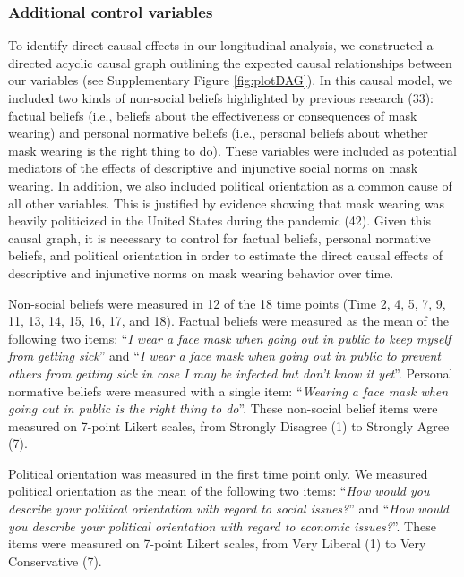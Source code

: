 \documentclass[
  man, donotrepeattitle,floatsintext]{apa6}
\begin{document}
\hypertarget{additional-control-variables}{%
\subsubsection{Additional control variables}\label{additional-control-variables}}

To identify direct causal effects in our longitudinal analysis, we constructed a directed acyclic causal graph outlining the expected causal relationships between our variables (see Supplementary Figure \ref{fig:plotDAG}). In this causal model, we included two kinds of non-social beliefs highlighted by previous research (33): factual beliefs (i.e., beliefs about the effectiveness or consequences of mask wearing) and personal normative beliefs (i.e., personal beliefs about whether mask wearing is the right thing to do). These variables were included as potential mediators of the effects of descriptive and injunctive social norms on mask wearing. In addition, we also included political orientation as a common cause of all other variables. This is justified by evidence showing that mask wearing was heavily politicized in the United States during the pandemic (42). Given this causal graph, it is necessary to control for factual beliefs, personal normative beliefs, and political orientation in order to estimate the direct causal effects of descriptive and injunctive norms on mask wearing behavior over time.

Non-social beliefs were measured in 12 of the 18 time points (Time 2, 4, 5, 7, 9, 11, 13, 14, 15, 16, 17, and 18). Factual beliefs were measured as the mean of the following two items: ``\emph{I wear a face mask when going out in public to keep myself from getting sick}'' and ``\emph{I wear a face mask when going out in public to prevent others from getting sick in case I may be infected but don't know it yet}''. Personal normative beliefs were measured with a single item: ``\emph{Wearing a face mask when going out in public is the right thing to do}''. These non-social belief items were measured on 7-point Likert scales, from Strongly Disagree (1) to Strongly Agree (7).

Political orientation was measured in the first time point only. We measured political orientation as the mean of the following two items: ``\emph{How would you describe your political orientation with regard to social issues?}'' and ``\emph{How would you describe your political orientation with regard to economic issues?}''. These items were measured on 7-point Likert scales, from Very Liberal (1) to Very Conservative (7).
\end{document}
